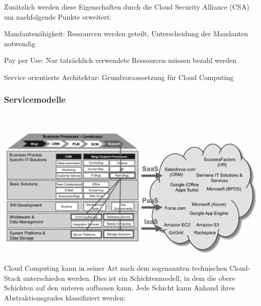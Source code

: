 \documentclass[12pt,a4paper,bibliography=totocnumbered,listof=totocnumbered]{scrartcl}
\begin{document}
Zusätzlich werden diese Eigenschaften durch die Cloud Security Alliance (CSA) \cite{36} um nachfolgende Punkte erweitert:
\begin{compactitem}
	\item Mandantenähigkeit: Ressourcen werden geteilt, Unterscheidung der Mandanten notwendig
	\item Pay per Use: Nur tatsächlich verwendete Ressourcen müssen bezahl werden
	\item Service orientierte Architektur: Grundvoraussetzung für Cloud Computing
\end{compactitem}

\subsubsection{Servicemodelle}

\vspace{1em}
$\;$\\
\begin{minipage}{\linewidth}
	\centering
	\includegraphics[width=1.0\linewidth]{IaaS_Modelle.png}
\end{minipage}
\vspace{1em}

Cloud Computing kann in seiner Art nach dem sogenannten technischen Cloud-Stack unterschieden werden. Dies ist ein Schichtenmodell, in dem die obere Schichten auf den unteren aufbauen kann. Jede Schicht kann Anhand ihres Abstraktionsgrades klassifiziert werden:
\end{document}
